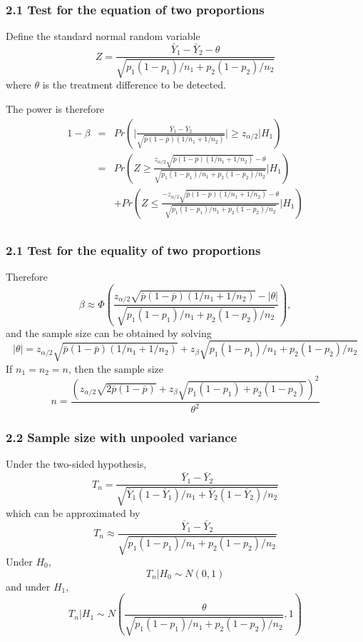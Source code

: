 \documentclass[table,10pt]{beamer}
\begin{document}
\begin{CJK*}{UTF8}{gbsn}
\begin{frame}[t]
\frametitle{2.1 Test for the equation of two proportions}
Define the standard normal random variable
$$
Z = \frac{\bar{Y}_1 - \bar{Y}_2 - \theta}{\sqrt{p_1(1-p_1)/n_1 + p_2(1-p_2)/n_2}}
$$
where $\theta$ is the treatment difference to be detected.

The power is therefore
$$
\begin{array}{lcl}
1-\beta &=& Pr \left( \big| \frac{\bar{Y}_1 - \bar{Y}_2}{\sqrt{\bar{p} (1-\bar{p})(1/n_1+1/n_2)}}\big| \ge z_{\alpha/2} \big| H_1\right)\\
&=& Pr \left( Z \ge \frac{z_{\alpha/2} \sqrt{\bar{p}(1-\bar{p})(1/n_1 + 1/n_2)} - \theta}{\sqrt{p_1(1-p_1)/n_1 + p_2(1-p_2)/n_2}} \big| H_1 \right)\\
 & & + Pr \left( Z \le \frac{-z_{\alpha/2} \sqrt{\bar{p}(1-\bar{p})(1/n_1 + 1/n_2)} - \theta}{\sqrt{p_1(1-p_1)/n_1 + p_2(1-p_2)/n_2}} \big| H_1 \right)\\
\end{array}
$$
\end{frame}

\begin{frame}[t]
\frametitle{2.1 Test for the equality of two proportions}
Therefore
$$
\beta \approx \Phi \left( \frac{z_{\alpha/2}\sqrt{\bar{p}(1-\bar{p})(1/n_1 + 1/n_2)} - |\theta|}{\sqrt{p_1(1-p_1)/n_1 + p_2(1-p_2)/n_2}} \right),
$$
and the sample size can be obtained by solving
$$
|\theta| = z_{\alpha/2} \sqrt{\bar{p}(1-\bar{p})(1/n_1+1/n_2)} + z_{\beta} \sqrt{p_1(1-p_1)/n_1 + p_2(1-p_2)/n_2}
$$
If $n_1 = n_2 = n$, then the sample size
$$
n = \frac{\left( z_{\alpha/2}\sqrt{2\bar{p}(1-\bar{p})} + z_{\beta} \sqrt{p_1(1-p_1) + p_2(1-p_2)}\right)^2}{\theta^2}
$$
\end{frame}


\begin{frame}[t]
\frametitle{2.2 Sample size with unpooled variance}
Under the two-sided hypothesis,
$$
T_n = \frac{\bar{Y}_1 - \bar{Y}_2}{\sqrt{\bar{Y}_1(1-\bar{Y}_1)/n_1 + \bar{Y}_2(1-\bar{Y}_2)/n_2}}
$$
which can be approximated by
$$
T_n \approx \frac{\bar{Y}_1 - \bar{Y}_2}{\sqrt{p_1(1-p_1)/n_1 + p_2(1-p_2)/n_2}}
$$
Under $H_0$,
$$
T_n \big| H_0 \sim N(0, 1)
$$
and under $H_1$,
$$
T_n \big| H_1 \sim N \left( \frac{\theta}{\sqrt{p_1(1-p_1)/n_1 + p_2(1-p_2)/n_2}},1 \right)
$$
\end{frame}



\end{CJK*}
\end{document}
